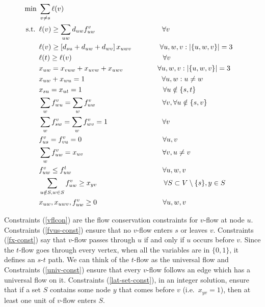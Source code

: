 \documentclass[11pt]{article}
\begin{document}
\begin{figure}[ht]
\begin{align}
\mbox{min}~ & \sum_{v\neq s} \ell(v) & \label{lp:lat}\\
\mbox{s.t.}~\, & \ell(v) \geq \sum_{uw} d_{uw} f^v_{uw}  
\hspace{33mm} \forall v \notag \\
& \ell(v) \geq [d_{su} + d_{uw} + d_{wv}]\, x_{uwv} \label{lk-const}  
\hspace{14mm} \forall u,w,v:|\{u,w,v\}|=3  \\
& \ell(t) \geq \ell(v) 
\hspace{45mm} \forall v \notag \\
& x_{uw}= x_{vuw} + x_{uvw} + x_{uwv} \label{xijk-const} 
\hspace{17mm} \forall u,w,v:|\{u,w,v\}|=3  \\
& x_{uw} + x_{wu} = 1  
\hspace{38mm} \forall u,w:u\neq w \label{xij-const} \\
& x_{su} = x_{ut} = 1  
\hspace{40mm} \forall u\notin \{s,t\} \notag \\
& \sum_w f^v_{wu} = \sum_w f^v_{uw}     
\hspace{33mm} \forall v, \forall u\notin \{s,v\} \label{vflcon} \\
& \sum_w f^v_{sw} = \sum_w f^v_{wv} = 1 
\hspace{27mm} \forall v \notag\\
& f^v_{us} = f^v_{vu} = 0  
\hspace{40mm} \forall u,v \label{fvus-const} \\
& \sum_w f^v_{uw} = x_{uv} 
\hspace{39mm} \forall v, u\neq v \label{fx-const} \\
& f^v_{uw} \leq f^t_{uw}   
\hspace{45mm} \forall u,w,v \label{univ-const}\\
& \sum_{u\notin S, w\in S} f^v_{uw} \geq x_{yv} 
\hspace{33mm} \forall S \subset V\setminus\{s\}, y\in S \label{lat-set-const} \\
& x_{uw}, x_{uwv}, f^v_{uw} \geq 0  
\hspace{32.5mm} \forall u,w,v   \notag
\end{align}
\end{figure}


Constraints (\ref{vflcon}) are the flow conservation constraints for $v$-flow at node $u$.
 Constraints (\ref{fvus-const}) ensure that no $v$-flow enters $s$ or leaves $v$. 
Constraints (\ref{fx-const}) say that $v$-flow passes through $u$ if and only if $u$ occurs before $v$. 
Since the $t$-flow goes through every vertex, when all the variables are in $\{0,1\}$, it defines an $s$-$t$ path.
We can think of the $t$-flow as the universal flow
and Constraints (\ref{univ-const}) ensure that every  $v$-flow follows an edge which
has a universal flow on it. 
Constraints (\ref{lat-set-const}), in an integer solution, ensure that if a set $S$ contains some node 
$y$ that comes before $v$ (i.e.\ $x_{yv}=1$), then at least one unit of $v$-flow enters $S$. 
\end{document}
